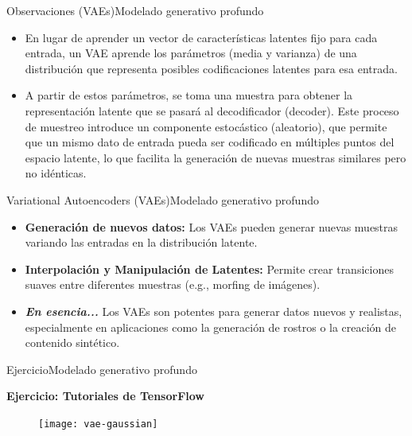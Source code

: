 \documentclass[10pt,border=3pt,tikz]{beamer}
\begin{document}
    \begin{frame}{Observaciones (VAEs)}{Modelado generativo profundo}
        \begin{itemize}
            \item En lugar de aprender un vector de características latentes fijo para cada entrada, un VAE aprende los parámetros (media y varianza) de una distribución que representa posibles codificaciones latentes para esa entrada.
            \item A partir de estos parámetros, se toma una muestra para obtener la representación latente que se pasará al decodificador (decoder). Este proceso de muestreo introduce un componente estocástico (aleatorio), que permite que un mismo dato de entrada pueda ser codificado en múltiples puntos del espacio latente, lo que facilita la generación de nuevas muestras similares pero no idénticas.
        \end{itemize}
    \end{frame}
    
    \begin{frame}{Variational Autoencoders (VAEs)}{Modelado generativo profundo}
        \begin{itemize}
            \item \textbf{Generación de nuevos datos:} Los VAEs pueden generar nuevas muestras variando las entradas en la distribución latente.
            \item \textbf{Interpolación y Manipulación de Latentes:} Permite crear transiciones suaves entre diferentes muestras (e.g., morfing de imágenes).
            \item \textbf{\textit{En esencia...}} Los VAEs son potentes para generar datos nuevos y realistas, especialmente en aplicaciones como la generación de rostros o la creación de contenido sintético.
        \end{itemize}
    \end{frame}
    
    \begin{frame}{Ejercicio}{Modelado generativo profundo}
        \begin{center}
            {\Large \textbf{Ejercicio: Tutoriales de TensorFlow}}
        \end{center}
        \begin{figure}
            \centering
            \texttt{[image: vae-gaussian]}
        \end{figure}
    \end{frame}
    
\end{document}

